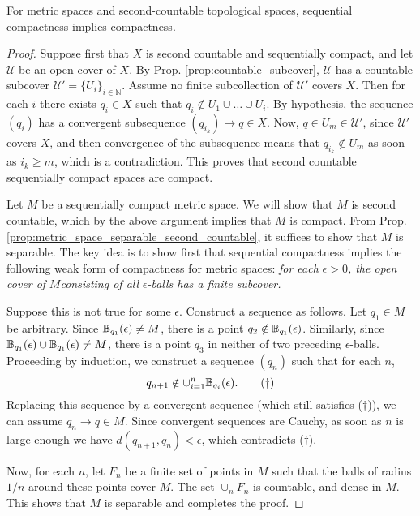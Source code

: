 \documentclass[11pt,a4paper]{article}
\begin{document}
\begin{prop}
For metric spaces and second-countable topological spaces, sequential compactness implies compactness.
\end{prop}

\begin{proof}
Suppose first that $X$ is second countable and sequentially compact, and let $\mathcal{U}$ be an open cover of $X$. By Prop. \ref{prop:countable_subcover}, $\mathcal{U}$ has a countable subcover $\mathcal{U}' = \{U_i\}_{i\in \mathbb{N}}$. Assume no finite subcollection of $\mathcal{U}'$ covers $X$. Then for each $i$ there exists $q_i\in X$ such that $q_i\notin U_1\cup\ldots\cup U_i$. By hypothesis, the sequence $(q_i)$ has a convergent subsequence $(q_{i_k})\rightarrow q\in X$. Now, $q\in U_m\in \mathcal{U}'$, since $\mathcal{U}'$ covers $X$, and then convergence of the subsequence means that $q_{i_k}\notin U_m$ as soon as $i_k\ge m$, which is a contradiction. This proves that second countable sequentially compact spaces are compact. 

Let $M$ be a sequentially compact metric space. We will show that $M$ is second countable, which by the above argument implies that $M$ is compact. From Prop. \ref{prop:metric_space_separable_second_countable}, it suffices to show that $M$ is separable. The key idea is to show first that sequential compactness implies the following weak form of compactness for metric spaces: \textit{for each} $\epsilon>0$\textit{, the open cover of }$M$\textit{consisting of all }$\epsilon$\textit{-balls has a finite subcover.} 

Suppose this is not true for some $\epsilon$. Construct a sequence as follows. Let $q_1\in M$ be arbitrary. Since $\mathbb{B}_{q_1}(\epsilon)\neq M$, there is a point $q_2\notin \mathbb{B}_{q_1}(\epsilon)$. Similarly, since $\mathbb{B}_{q_1}(\epsilon)\cup \mathbb{B}_{q_1}(\epsilon) \neq M$, there is a point $q_3$ in neither of two preceding $\epsilon$-balls. Proceeding by induction, we construct a sequence $(q_n)$ such that for each $n$, $$q_{n+1}\notin \cup_{i=1}^n \mathbb{B}_{q_i}(\epsilon).\qquad{(\dagger)}$$ 
Replacing this sequence by a convergent sequence (which still satisfies ($\dagger$)), we can assume $q_n\rightarrow q\in M$. Since convergent sequences are Cauchy, as soon as $n$ is large enough we have $d(q_{n+1},q_n)<\epsilon$, which contradicts ($\dagger$). 

Now, for each $n$, let $F_n$ be a finite set of points in $M$ such that the balls of radius $1/n$ around these points cover $M$. The set $\cup_n F_n$ is countable, and dense in $M$. This shows that $M$ is separable and completes the proof.
\end{proof}
\end{document}
